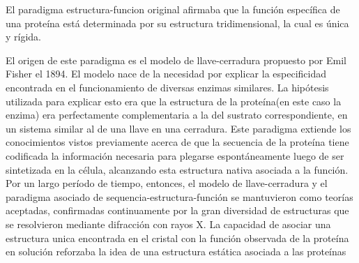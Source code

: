 El paradigma estructura-funcion original afirmaba que la función específica de una proteína está determinada por su estructura tridimensional, la cual es única y rígida. 

El origen de este paradigma es el modelo de llave-cerradura propuesto por Emil Fisher el 1894. El modelo nace de la necesidad por explicar la especificidad encontrada en el funcionamiento de diversas enzimas similares. 
La hipótesis utilizada para explicar esto era que la estructura de la proteína(en este caso la enzima) era perfectamente complementaria a la del sustrato correspondiente, en un sistema similar al de una llave en una cerradura.
Este paradigma extiende los conocimientos vistos previamente acerca de que la secuencia de la proteína tiene codificada la información necesaria para plegarse espontáneamente luego de ser sintetizada en la célula,
alcanzando esta estructura nativa asociada a la función.
Por un largo período de tiempo, entonces, el modelo de llave-cerradura y el paradigma asociado de sequencia-estructura-función se mantuvieron como teorías aceptadas, confirmadas continuamente por la
gran diversidad de estructuras que se resolvieron mediante difracción con rayos X. 
La capacidad de asociar una estructura unica encontrada en el cristal con la función observada de la proteína en solución reforzaba la idea de una estructura estática asociada a las proteínas

